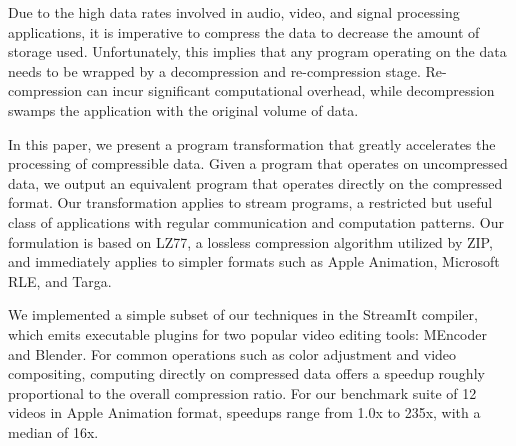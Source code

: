 Due to the high data rates involved in audio, video, and signal
processing applications, it is imperative to compress the data to
decrease the amount of storage used.  Unfortunately, this implies that
any program operating on the data needs to be wrapped by a
decompression and re-compression stage.  Re-compression can incur
significant computational overhead, while decompression swamps the
application with the original volume of data.

In this paper, we present a program transformation that greatly
accelerates the processing of compressible data.  Given a program that
operates on uncompressed data, we output an equivalent program that
operates directly on the compressed format.  Our transformation
applies to stream programs, a restricted but useful class of
applications with regular communication and computation patterns.  Our
formulation is based on LZ77, a lossless compression algorithm
utilized by ZIP, and immediately applies to simpler formats such as
Apple Animation, Microsoft RLE, and Targa.

We implemented a simple subset of our techniques in the StreamIt
compiler, which emits executable plugins for two popular video editing
tools: MEncoder and Blender.  For common operations such as color
adjustment and video compositing, computing directly on compressed
data offers a speedup roughly proportional to the overall compression
ratio.  For our benchmark suite of 12 videos in Apple Animation
format, speedups range from 1.0x to 235x, with a median of 16x.
